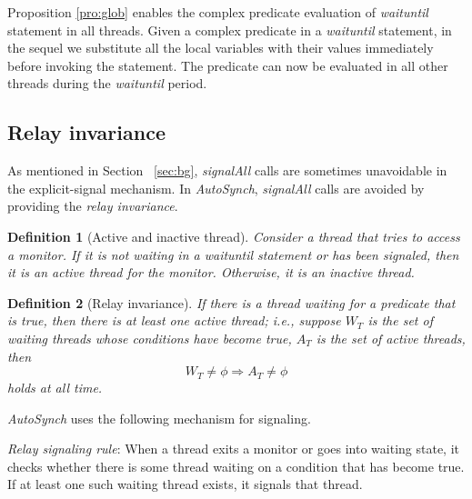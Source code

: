 \documentclass{sigplanconf}
\newtheorem{definition}{Definition}
\begin{document}
Proposition \ref{pro:glob} enables the complex predicate evaluation of
{\em waituntil} statement in all threads. 
Given a complex predicate in a {\em waituntil} statement, in the sequel we substitute
all the local variables with their values immediately before invoking the
statement. The predicate can now be evaluated in all other threads during the
{\em waituntil} period. 

\subsection{Relay invariance} \label{sec:relay}
As mentioned in Section ~\ref{sec:bg}, {\em signalAll} calls are sometimes unavoidable
in the explicit-signal mechanism. In {\em AutoSynch}, {\em signalAll} calls are 
avoided by providing the {\em relay invariance}. 

\begin{definition}[Active and inactive thread] 
    Consider a thread that tries to access a monitor. If it is not waiting in a
    {\em waituntil} statement or has been signaled, then it is an {\em active} 
    thread for the monitor. Otherwise, it is an {\em inactive} thread. 
\end{definition}

\begin{definition}[Relay invariance]
    If there is a thread waiting for a predicate that is true, then there is at
    least one active thread; i.e., suppose $W_T$ is the set of waiting threads
    whose conditions have become true, $A_T$ is the set of active threads,
    then
    \[
        W_T \ne \phi \Rightarrow A_T \ne \phi 
    \]
    holds at all time. 
\end{definition}

{\em AutoSynch} uses the following mechanism for signaling.

{\em Relay signaling rule}: When a thread exits a monitor or goes into waiting 
    state, it checks whether there is some thread waiting on a condition that 
    has become true. If at least one such waiting thread exists, it signals that 
    thread.
    
\end{document}
